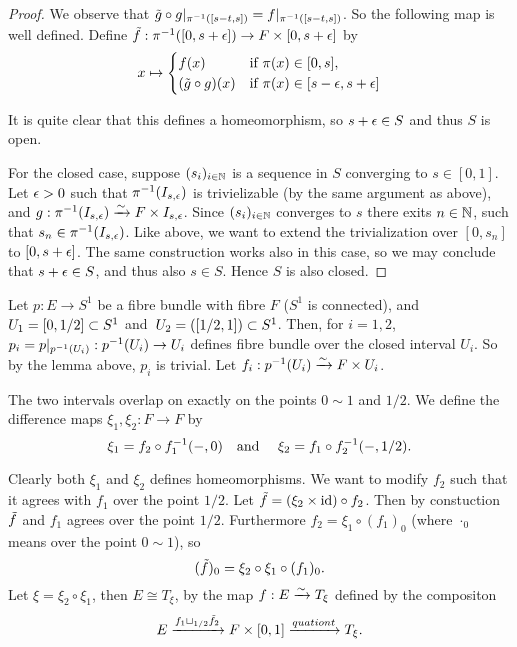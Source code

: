 \documentclass[a4paper,11pt,english]{article}
\begin{document}
\begin{exercise}[3]
\begin{enumerate}
\begin{proof}
We observe that $\til g\circ g|_{\pi\i([s-t,s])} = f|_{\pi\i([s-t,s])}$. So
the following map is well defined. Define $\til f: \pi\i([0,s+\eps]) \to F\times
[0,s+\eps]$ by
\[ x \mapsto \pwf{
f(x) &\tif \pi(x) \in [0,s], \\
(\til g \circ g)(x) &\tif \pi(x) \in [s-\eps,s+\eps] } \]

It is quite clear that this defines a homeomorphism, so $s + \eps \in S$ and
thus $S$ is open.

For the closed case, suppose $(s_i)_{i\in \N}$ is a sequence in $S$ converging
to $s \in [0,1]$. Let $\eps > 0$ such that $\pi\i(\Bes)$ is trivielizable (by
the same argument as above), and $g : \pi\i(\Bes) \congto F \times \Bes$. Since
$(s_i)_{i\in \N}$ converges to $s$ there exits $n \in \N$, such that $s_n \in
\pi\i(\Bes)$. Like above, we want to extend the trivialization over $[0,s_n]$ to
$[0,s+\eps]$.
The same construction works also in this case, so we may conclude that
$s+\eps\in S$, and thus also $s\in S$. Hence $S$ is also closed.
\end{proof}

Let $p : E \to S^1$ be a fibre bundle with fibre $F$ ($S^1$ is connected), and
$U_1 = [0, 1/2] \ss S^1$ and $U_2 = ([1/2,1]) \ss S^1$. Then, for $i=1,2$, 
$p_i = p|_{p\i(U_i)} : p\i(U_i) \to U_i$ defines fibre bundle over the closed
interval $U_i$. So by the lemma above, $p_i$ is trivial. Let $f_i : p\i(U_i)
\congto F \times U_i$.

The two intervals overlap on exactly on the points $0 \sim 1$ and $1/2$. We define
the difference maps $\xi_1, \xi_2: F \to F$ by
\[ \xi_1 = f_2 \circ f_1\i(-,0) \qq\tand
\xi_2 = f_1 \circ f_2\i(-,1/2). \]

Clearly both $\xi_1$ and $\xi_2$ defines homeomorphisms. We want to modify $f_2$
such that it agrees with $f_1$ over the point $1/2$.
Let $\til f = (\xi_2 \times \id) \circ f_2$. Then by constuction $\til f$ and
$f_1$ agrees over the point $1/2$. Furthermore $f_2 = \xi_1 \circ (f_1)_0$
(where $\cdot_0$ means over the point $0\sim 1$), so
\[ (\til f)_0 = \xi_2 \circ \xi_1 \circ (f_1)_0. \]
Let $\xi = \xi_2 \circ \xi_1$, then $E \cong T_\xi$, by the map $f : E \congto
T_\xi$ defined by the compositon
\[ E \xto{ f_1 \sqcup_{1/2} \til f_2 } F \times [0,1]
\xto{quationt} T_\xi. \]
\end{enumerate}
\end{exercise}
\end{document}

